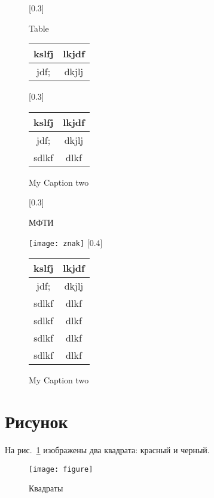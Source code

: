\documentclass[a4paper,14pt]{extarticle}
\begin{document}
\begin{figure}[H]
	\begin{floatrow}
		[0.3\textwidth]{\caption{Table} }{
			\begin{tabular}{|c|c|}
				\hline
				kslfj & lkjdf \\ \hline
				jdf; & dkjlj \\ \hline
			\end{tabular}
		}
		[0.3\textwidth]{\caption{My Caption two}}{
			\begin{tabular}{|c|c|}
				\hline
				kslfj & lkjdf \\ \hline
				jdf; & dkjlj \\ \hline
				sdlkf & dlkf\\ \hline
			\end{tabular}
		}
	\end{floatrow}
\end{figure}

\begin{figure}[H]
	 \CenterFloatBoxes
	\begin{floatrow}
		[0.3\textwidth]{\caption{МФТИ} }{
			\texttt{[image: znak]}
		}
		[0.4\textwidth]{\caption{My Caption two}}{
			\begin{tabular}{|c|c|}
				\hline
				kslfj & lkjdf \\ \hline
				jdf; & dkjlj \\ \hline
				sdlkf & dlkf\\ \hline
				sdlkf & dlkf\\ \hline
				sdlkf & dlkf\\ \hline
				sdlkf & dlkf\\ \hline
			\end{tabular}
		}
	\end{floatrow}
\end{figure}


\newpage
\section*{Рисунок}

На рис.~\ref{squares} изображены два квадрата: красный и черный.

\begin{figure}[H]
	\centering
	\texttt{[image: figure]}
	\caption{Квадраты}\label{squares}
\end{figure}
\end{document}
